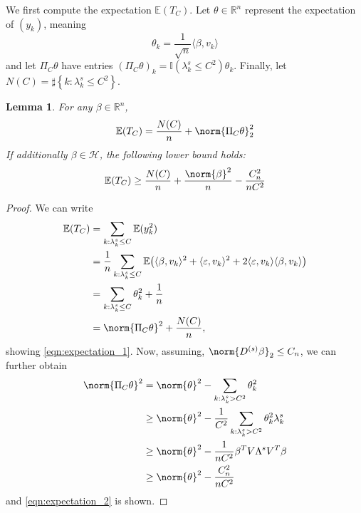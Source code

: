 \documentclass{article}
\newcommand{\Reals}{\mathbb{R}}
\newcommand{\set}[1]{\left\{#1\right\}}
\newcommand{\dotp}[2]{\langle #1, #2 \rangle}
\newcommand{\1}{\mathbb{I}}
\newcommand{\Ebb}{\mathbb{E}}
\theoremstyle{alden}
\theoremstyle{aldenthm}
\newtheorem{lemma}{Lemma}
\theoremstyle{definition}
\theoremstyle{remark}
\begin{document}
We first compute the expectation $\Ebb(T_C)$. Let $\theta \in \Reals^n$ represent the expectation of $(y_k)$, meaning
\begin{equation*}
\theta_k = \frac{1}{\sqrt{n}}\dotp{\beta}{v_k}
\end{equation*}
and let $\Pi_C\theta$ have entries $(\Pi_C \theta)_k = \1(\lambda_k^{s} \leq C^2) \theta_k$. Finally, let $N(C) = \sharp\set{k: \lambda_k^{s} \leq C^2}$. 

\begin{lemma}
	\label{lem:expectation}
	For any $\beta \in \Reals^n$,
	\begin{equation}
	\label{eqn:expectation_1}
	\Ebb(T_C) = \frac{N(C)}{n} + \norm{\Pi_C \theta}_2^2 
	\end{equation}
	If additionally $\beta \in \mathcal{H}$, the following lower bound holds:
	\begin{equation}
	\label{eqn:expectation_2}
	\Ebb(T_C) \geq \frac{N(C)}{n} + \frac{\norm{\beta}^2}{n}  - \frac{C_n^2}{nC^{2}}
	\end{equation}
\end{lemma}
\begin{proof}
	We can write
	\begin{align*}
	\Ebb(T_C) & = \sum_{k: \lambda_k^s \leq C} \Ebb(y_k^2) \\
	& = \frac{1}{n}\sum_{k: \lambda_k^s \leq C} \Ebb\bigl(\dotp{\beta}{v_k}^2 + \dotp{\varepsilon}{v_k}^2 + 2 \dotp{\varepsilon}{v_k} \dotp{\beta}{v_k}\bigr) \\
	& = \sum_{k: \lambda_k^s \leq C}\theta_k^2 + \frac{1}{n} \\
	& = \norm{\Pi_C \theta}^2 + \frac{N(C)}{n},
	\end{align*}
	showing \eqref{eqn:expectation_1}. Now, assuming, $\norm{D^{(s)}\beta}_2 \leq C_n$, we can further obtain
	\begin{align*}
	\norm{\Pi_C \theta}^2 & = \norm{\theta}^2 - \sum_{k:\lambda_k^s > C^2} \theta_k^2 \\
	& \geq \norm{\theta}^2 - \frac{1}{C^{2}}\sum_{k:\lambda_k^s > C^2} \theta_k^2 \lambda_k^s \\
	& \geq \norm{\theta}^2 -\frac{1}{nC^2} \beta^T V \Lambda^s V^T \beta \\
	& \geq \norm{\theta}^2  - \frac{C_n^2}{nC^{2}}
	\end{align*}
	and \eqref{eqn:expectation_2} is shown.
\end{proof}
\end{document}
